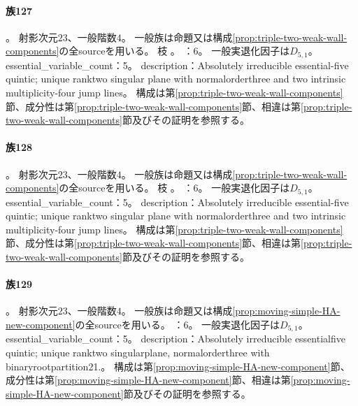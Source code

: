 \paragraph{族127}\label{catalogue:R4_PLANE_DOUBLE_LINE_CUBIC_M3_TRIPLE_4_21_23}
。
射影次元$23$、一般階数$4$。
一般族は命題又は構成\ref{prop:triple-two-weak-wall-components}の全sourceを用いる。
枝 。
：6。
一般実退化因子は$D_{5,1}$。
essential\_variable\_count：5。
description：Absolutely irreducible essential-five quintic; unique ranktwo singular plane with normalorderthree and two intrinsic multiplicity-four jump lines。
構成は第\ref{prop:triple-two-weak-wall-components}節、成分性は第\ref{prop:triple-two-weak-wall-components}節、相違は第\ref{prop:triple-two-weak-wall-components}節及びその証明を参照する。

\paragraph{族128}\label{catalogue:R4_PLANE_DOUBLE_LINE_CUBIC_M3_TRIPLE_1_12_23}
。
射影次元$23$、一般階数$4$。
一般族は命題又は構成\ref{prop:triple-two-weak-wall-components}の全sourceを用いる。
枝 。
：6。
一般実退化因子は$D_{5,1}$。
essential\_variable\_count：5。
description：Absolutely irreducible essential-five quintic; unique ranktwo singular plane with normalorderthree and two intrinsic multiplicity-four jump lines。
構成は第\ref{prop:triple-two-weak-wall-components}節、成分性は第\ref{prop:triple-two-weak-wall-components}節、相違は第\ref{prop:triple-two-weak-wall-components}節及びその証明を参照する。

\paragraph{族129}\label{catalogue:R4_PLANE_DOUBLE_LINE_CUBIC_M3_MOVING_SIMPLE_2_15_23}
。
射影次元$23$、一般階数$4$。
一般族は命題又は構成\ref{prop:moving-simple-HA-new-component}の全sourceを用いる。
：6。
一般実退化因子は$D_{5,1}$。
essential\_variable\_count：5。
description：Absolutely irreducible essentialfive quintic; unique ranktwo singularplane, normalorderthree with binaryrootpartition21.。
構成は第\ref{prop:moving-simple-HA-new-component}節、成分性は第\ref{prop:moving-simple-HA-new-component}節、相違は第\ref{prop:moving-simple-HA-new-component}節及びその証明を参照する。


